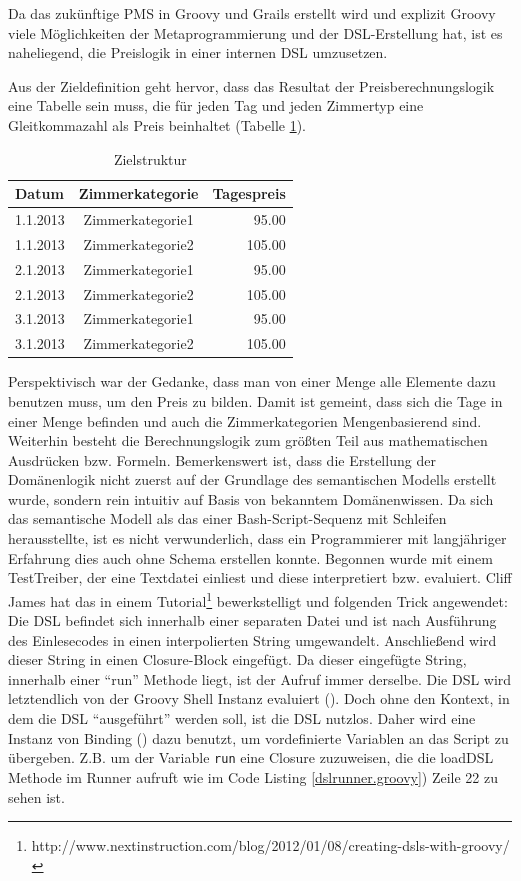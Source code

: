 \documentclass[11pt,english,ngerman, headsepline]{scrreprt}
\begin{document}
Da das zukünftige PMS in Groovy und Grails erstellt wird und explizit Groovy viele
Möglichkeiten der Metaprogrammierung und der DSL-Erstellung hat, ist es
naheliegend, die Preislogik in einer internen DSL umzusetzen. 

Aus der Zieldefinition geht hervor, dass das Resultat der Preisberechnungslogik
eine Tabelle sein muss, die für jeden Tag und jeden Zimmertyp eine Gleitkommazahl als
Preis beinhaltet (Tabelle \ref{zielDefinition}).  

\begin{table}[htpb]
  \centering
  \begin{tabular}{| l | c | r |} 
 	\hline 
  	Datum & Zimmerkategorie & Tagespreis \\
  	\hline 
	1.1.2013 &  Zimmerkategorie1 &  95.00 \\
	1.1.2013 &  Zimmerkategorie2 &  105.00 \\
	2.1.2013 &  Zimmerkategorie1 &  95.00 \\
	2.1.2013 &  Zimmerkategorie2 &  105.00 \\
	3.1.2013 &  Zimmerkategorie1 &  95.00 \\
	3.1.2013 &  Zimmerkategorie2 &  105.00 \\
	\hline 
  	\end{tabular}  
 	\caption{Zielstruktur}
  \label{zielDefinition}
\end{table}	 

Perspektivisch war der Gedanke, dass man von einer Menge alle Elemente dazu
benutzen muss, um den Preis zu bilden. Damit ist gemeint, dass sich die Tage in
einer Menge befinden und auch die Zimmerkategorien Mengenbasierend sind.
Weiterhin besteht die Berechnungslogik zum größten Teil aus mathematischen
Ausdrücken bzw. Formeln.
Bemerkenswert ist, dass die Erstellung der Domänenlogik nicht zuerst auf der
Grundlage des semantischen Modells erstellt wurde, sondern rein intuitiv auf
Basis von bekanntem Domänenwissen. Da sich das semantische Modell als das einer
Bash-Script-Sequenz mit Schleifen herausstellte, ist es nicht verwunderlich,
dass ein Programmierer mit langjähriger Erfahrung dies auch ohne Schema erstellen
konnte.
Begonnen wurde mit einem TestTreiber, der eine Textdatei einliest und diese
interpretiert bzw. evaluiert.
Cliff James hat das in einem
Tutorial\footnote{http://www.nextinstruction.com/blog/2012/01/08/creating-dsls-with-groovy/}
bewerkstelligt und folgenden Trick angewendet:
Die DSL befindet sich innerhalb einer separaten Datei und ist nach Ausführung
des Einlesecodes in einen interpolierten String umgewandelt. Anschließend wird
dieser String in einen Closure-Block eingefügt.
Da dieser eingefügte String, innerhalb einer ``run'' Methode liegt, ist der
Aufruf immer derselbe.
Die DSL wird letztendlich von der Groovy Shell Instanz evaluiert (\cite[S.
368]{koenig2007groovy}).
Doch ohne den Kontext, in dem die DSL ``ausgeführt'' werden soll, ist die DSL
nutzlos. Daher wird eine Instanz von Binding (\cite[S. 368]{koenig2007groovy})
dazu benutzt, um vordefinierte Variablen an das Script zu übergeben.
Z.B. um der Variable \texttt{run} eine Closure
zuzuweisen, die die loadDSL Methode im Runner aufruft wie im Code Listing
\ref{dslrunner.groovy}) Zeile 22 zu sehen ist.
 
\end{document}
